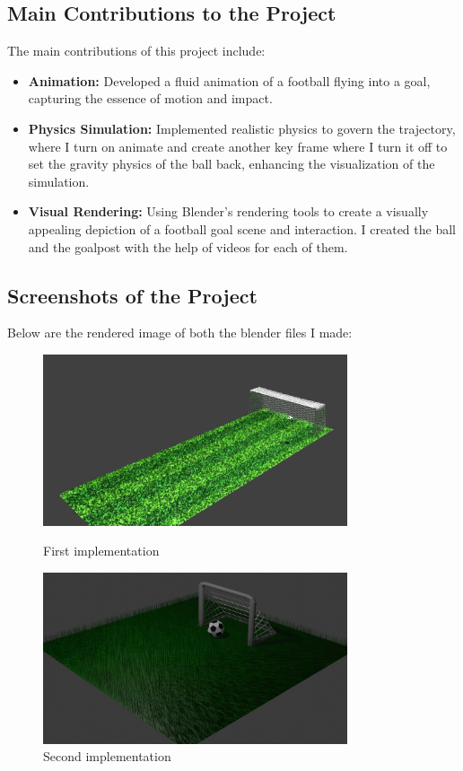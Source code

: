 \documentclass[ fontsize=11pt,twoside]{scrartcl}	%
\begin{document}
\subsection{Main Contributions to the Project}
The main contributions of this project include:
\begin{itemize}
    \item \textbf{Animation:} Developed a fluid animation of a football flying into a goal, capturing the essence of motion and impact.
    \item \textbf{Physics Simulation:} Implemented realistic physics to govern the trajectory, where I turn on animate and create another key frame where I turn it off to set the gravity physics of the ball back, enhancing the visualization of the simulation.
    \item \textbf{Visual Rendering:} Using Blender's rendering tools to create a visually appealing depiction of a football goal scene and interaction. I created the ball and the goalpost with the help of videos for each of them.
\end{itemize}
\subsection{Screenshots of the Project}
Below are the rendered image of both the blender files I made:

    \begin{figure}[!htb]
        \centering
        \includegraphics[width=0.8\textwidth]{Blender_1_RenderedImage.png}
        \caption{First implementation}
        \includegraphics[width=0.8\textwidth]{Blender_2_RenderedImage.png}
        \caption{Second implementation}
        \label{fig:Blender_Renders}
    \end{figure}
\end{document}
